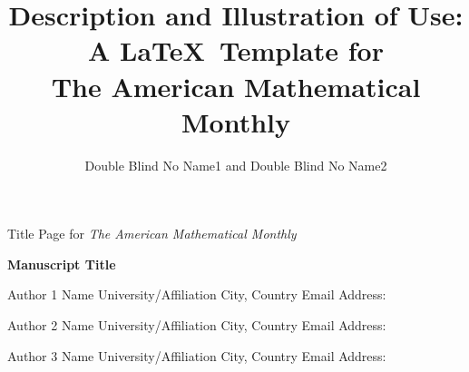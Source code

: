 \documentclass{article}
\theoremstyle{theorem}
\theoremstyle{definition}
\begin{document}

\begin{center}
{\LARGE{Title Page for \textit{The American Mathematical Monthly}}}
\end{center}



\vspace{150px}
\begin{center}

\textbf{Manuscript Title} \\
\vspace{25px}

Author 1 Name
University/Affiliation
City, Country
Email Address:

\vspace{15px}

Author 2 Name
University/Affiliation
City, Country
Email Address:

\vspace{15px}

Author 3 Name
University/Affiliation
City, Country
Email Address:

\end{center}
\pagebreak

\title{Description and Illustration of Use:\\ A \LaTeX\ Template for\\ The American Mathematical Monthly } %
\author{Double Blind No Name1 and Double Blind No Name2}  %
\end{document}
